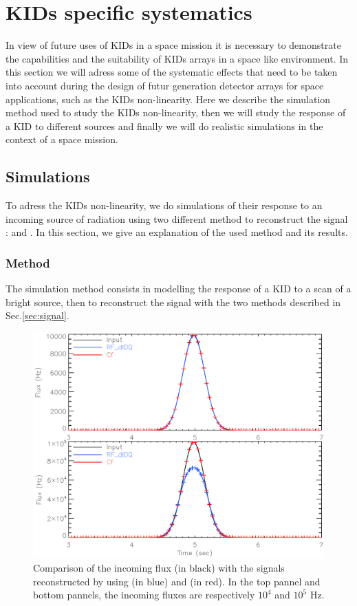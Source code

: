 
\section{KIDs specific systematics}
\label{sec:KID-systematics}

In view of future uses of KIDs in a space mission it is necessary to demonstrate the capabilities and the suitability of KIDs arrays in a space like environment. In this section we will adress some of the systematic effects that need to be taken into account during the design of futur generation detector arrays for space applications, such as the KIDs non-linearity. Here we describe the simulation method used to study the KIDs non-linearity, then we will study the response of a KID to different sources and finally we will do realistic simulations in the context of a space mission.

\subsection{Simulations}
To adress the KIDs non-linearity, we do simulations of their response to an incoming source of radiation using two different method to reconstruct the signal : \rf and \cf. In this section, we give an explanation of the used method and its results.

	\subsubsection{Method}
	
The simulation method consists in modelling the response of a KID to a scan of a bright source, then to reconstruct the signal with the two methods described in Sec.\ref{sec:signal}.

\begin{figure}[h]
\center
\includegraphics[scale=0.55]{Figures/planets.eps}
\caption{Comparison of the incoming flux (in black) with the signals reconstructed by using \rf (in blue) and \cf (in red). In the top pannel and bottom pannels, the incoming fluxes are respectively $10^{4}$ and $10^{5}$ Hz.}
\label{fig:planets}
\end{figure}

